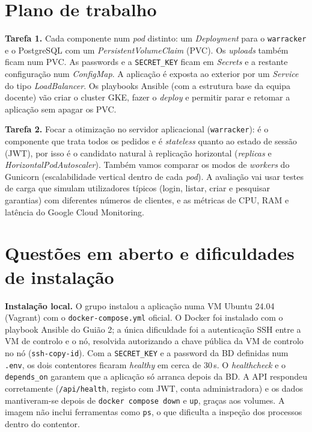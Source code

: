 \documentclass[11pt,a4paper]{article}
\newcommand{\code}[1]{\texttt{#1}}
\begin{document}
\section{Plano de trabalho}
\textbf{Tarefa 1.} Cada componente num \emph{pod} distinto: um \emph{Deployment} para o
\code{warracker} e o PostgreSQL com um \emph{PersistentVolumeClaim} (PVC). Os \emph{uploads} também
ficam num PVC. As passwords e a \code{SECRET\_KEY} ficam em \emph{Secrets} e a restante configuração num
\emph{ConfigMap}. A aplicação é exposta ao exterior por um \emph{Service} do tipo \emph{LoadBalancer}.
Os playbooks Ansible (com a estrutura base da equipa docente) vão criar o cluster GKE, fazer o
\emph{deploy} e permitir parar e retomar a aplicação sem apagar os PVC.

\textbf{Tarefa 2.} Focar a otimização no servidor aplicacional (\code{warracker}): é o componente que
trata todos os pedidos e é \emph{stateless} quanto ao estado de sessão (JWT), por isso é o candidato
natural à replicação horizontal (\emph{replicas} e \emph{HorizontalPodAutoscaler}). Também vamos
comparar os modos de \emph{workers} do Gunicorn (escalabilidade vertical dentro de cada \emph{pod}). A avaliação vai
usar testes de carga que simulam utilizadores típicos (login, listar, criar e pesquisar garantias)
com diferentes números de clientes, e as métricas de CPU, RAM e latência do Google Cloud Monitoring.

\section{Questões em aberto e dificuldades de instalação}
\textbf{Instalação local.} O grupo instalou a aplicação numa VM Ubuntu 24.04 (Vagrant) com o
\code{docker-compose.yml} oficial. O Docker foi instalado com o playbook Ansible do Guião 2; a única
dificuldade foi a autenticação SSH entre a VM de controlo e o nó, resolvida autorizando a chave pública
da VM de controlo no nó (\code{ssh-copy-id}). Com a \code{SECRET\_KEY} e a password da BD definidas num
\code{.env}, os dois contentores ficaram \emph{healthy} em cerca de 30\,s. O \emph{healthcheck} e o
\code{depends\_on} garantem que a aplicação só arranca depois da BD. A API respondeu corretamente
(\code{/api/health}, registo com JWT, conta administradora) e os dados mantiveram-se depois de
\code{docker compose down} e \code{up}, graças aos volumes. A imagem não inclui ferramentas como
\code{ps}, o que dificulta a inspeção dos processos dentro do contentor.
\end{document}
